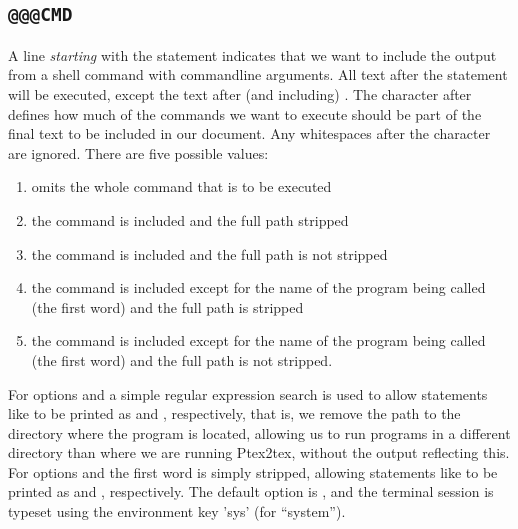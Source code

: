 \documentclass[a4paper,11pt]{article}
\begin{document}
{\subsection{\texttt{@@@CMD}}
A line \emph{starting} with the statement  indicates that we want to include
the output from a shell command with commandline arguments. All text after
the statement  will be executed, except the text after (and including)
. The character after  defines how much of the commands we
want to execute should be part of the final text to be included in our
document. Any whitespaces after the character are ignored. There are five possible values:
\begin{enumerate}
\item
{} omits the whole command that is to be executed
\item
{} the command is included and the full path stripped
\item
{} the command is included and the full path is not stripped
\item
{} the command is included except for the name of the program being
called (the first word) and the full path is stripped
\item
{} the command is included except for the name of the program being
called (the first word) and the full path is not stripped. 
\end{enumerate}
For options  and  a simple regular expression search is used
to allow statements like 
to be printed as  and ,
respectively, that is, we remove the path to the directory where
the program is located, allowing us to run programs in a different directory
than where we are running Ptex2tex, without the output reflecting this.
For options  and  the first word is simply stripped,
allowing statements like  to be printed as 
and , respectively. The default option is ,
and the terminal session is typeset using the environment key 'sys' (for ``system'').

}
\end{document}
